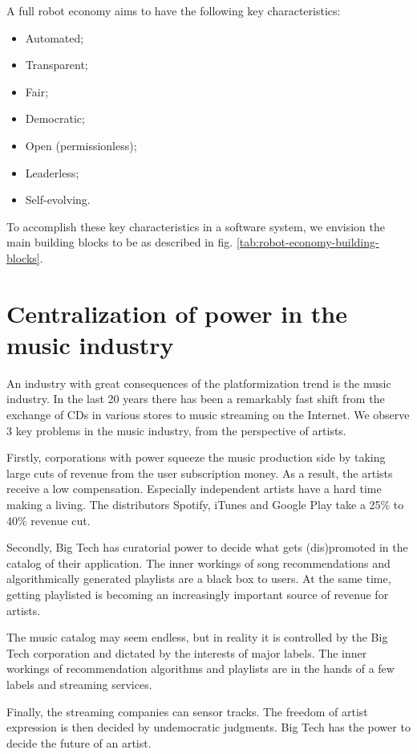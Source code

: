 A full robot economy aims to have the following key characteristics: 
\begin{itemize}
    \item Automated;
    \item Transparent;
    \item Fair;
    \item Democratic;
    \item Open (permissionless);
    \item Leaderless;
    \item Self-evolving.
\end{itemize}
To accomplish these key characteristics in a software system, we envision the main building blocks to be as described in fig. \ref{tab:robot-economy-building-blocks}.

\section{Centralization of power in the music industry}
An industry with great consequences of the platformization trend is the music industry. In the last 20 years there has been a remarkably fast shift from the exchange of CDs in various stores to music streaming on the Internet. We observe 3 key problems in the music industry, from the perspective of artists.

Firstly, corporations with power squeeze the music production side by taking large cuts of revenue from the user subscription money. As a result, the artists receive a low compensation. Especially independent artists have a hard time making a living. The distributors Spotify, iTunes and Google Play take a 25\% to 40\% revenue cut.

Secondly, Big Tech has curatorial power to decide what gets (dis)promoted in the catalog of their application. The inner workings of song recommendations and algorithmically generated playlists are a black box to users. At the same time, getting playlisted is becoming an increasingly important source of revenue for artists.

The music catalog may seem endless, but in reality it is controlled by the Big Tech corporation and dictated by the interests of major labels. The inner workings of recommendation algorithms and playlists are in the hands of a few labels and streaming services.

Finally, the streaming companies can sensor tracks. The freedom of artist expression is then decided by undemocratic judgments. Big Tech has the power to decide the future of an artist.

